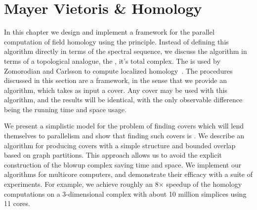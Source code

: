 \section{Mayer Vietoris \& Homology}
In this chapter we design and implement a framework for the parallel computation of field homology using the \mv principle. Instead of defining this
algorithm directly in terms of the \mv spectral sequence, we discuss the algorithm in terms of a topological analogue, the \mvb{}, it's total complex.  
The \mvb{} is used by Zomorodian and Carlsson to compute localized homology~\cite{zc-lh-08}.  The procedures discussed in this section 
are a framework, in the sense that we provide an algorithm, which takes as input a cover. Any cover may be used with this algorithm,
and the results will be identical, with the only observable difference being the running time and space usage. 

We present a simplistic model for the problem of finding covers which will lend themselves to parallelism and show that finding such covers is \NPH{}.
We describe an algorithm for producing covers with a simple structure and bounded overlap based on graph partitions. This approach allows
us to avoid the explicit construction of the blowup complex saving time and space. We implement our algorithms for multicore computers, 
and demonstrate their efficacy with a suite of experiments.  For example, we achieve roughly an 8$\times$ 
speedup of the homology computations on a 3-dimensional complex with about 10 million simplices using 11 cores.

